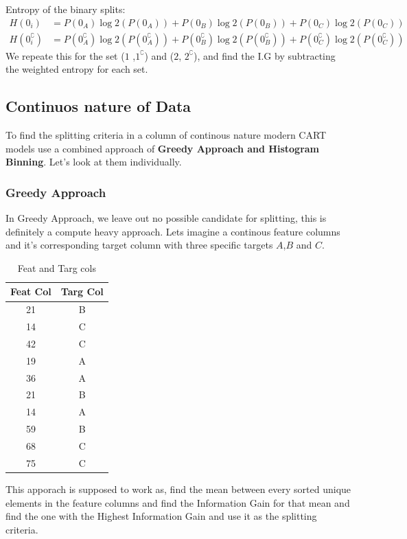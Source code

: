 \documentclass[12pt,letterpaper]{article}
\begin{document}
Entropy of the binary splits:
\begin{align*}
    H(0_i) &= P(0_A) \log2(P(0_A))+P(0_B) \log2(P(0_B))+P(0_C) \log2(P(0_C)) \\
    H(0^{\complement}_i) &= P(0^{\complement}_A) \log2(P(0^{\complement}_A))+P(0^{\complement}_B) \log2(P(0^{\complement}_B))+P(0^{\complement}_C) \log2(P(0^{\complement}_C))
\end{align*}
We repeate this for the set ($1$ ,$1^{\complement}$) and ($2$, $2^{\complement}$), and find the I.G by subtracting the weighted entropy for each set.


\subsection{Continuos nature of Data}
To find the splitting criteria in a column of continous nature modern CART models use a combined approach of \textbf{Greedy Approach and Histogram Binning}. Let's look at them individually.

\subsubsection{Greedy Approach}
In Greedy Approach, we leave out no possible candidate for splitting, this is definitely a compute heavy approach. Lets imagine a continous feature columns and it's corresponding target column with three specific targets $A$,$B$ and $C$.

\begin{table}[H]
    \centering
    \label{Tabular view of distribution}
    \begin{tabular}{|c|c|}
        \hline
        Feat Col & Targ Col \\
        \hline
        21 & B \\
        14 & C \\
        42 & C \\
        19 & A \\
        36 & A \\
        21 & B \\
        14 & A \\
        59 & B \\
        68 & C \\
        75 & C \\
        \hline
    \end{tabular}
    \caption{Feat and Targ cols}
\end{table}

This apporach is supposed to work as, find the mean between every sorted unique elements in the feature columns and find the Information Gain for that mean and find the one with the Highest Information Gain and use it as the splitting criteria. 
\end{document}
